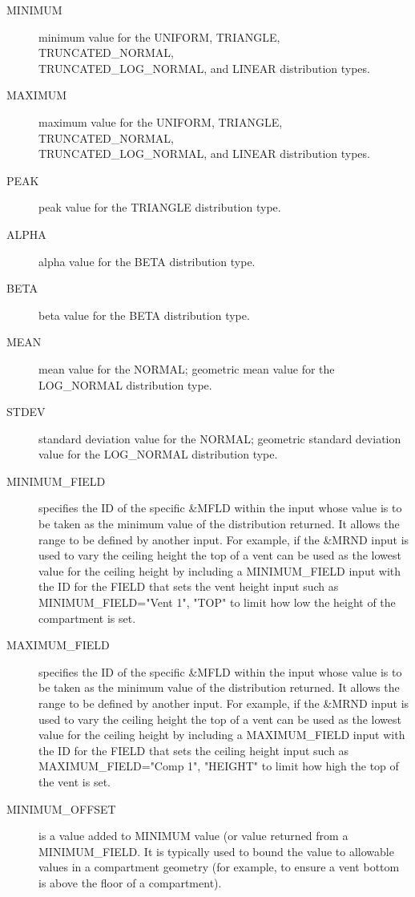 \documentclass[12pt,twoside]{book}
\begin{document}
\begin{description}
  \item[MINIMUM] minimum value for the {\ct UNIFORM}, {\ct TRIANGLE}, {\ct TRUNCATED\_NORMAL}, \\
      {\ct TRUNCATED\_LOG\_NORMAL}, and {\ct LINEAR} distribution types.
  \item[MAXIMUM] maximum value for the {\ct UNIFORM}, {\ct TRIANGLE}, {\ct TRUNCATED\_NORMAL}, \\
      {\ct TRUNCATED\_LOG\_NORMAL}, and {\ct LINEAR} distribution types.
  \item[PEAK] peak value for the {\ct TRIANGLE} distribution type.
  \item[ALPHA] alpha value for the {\ct BETA} distribution type.
  \item[BETA] beta value for the {\ct BETA} distribution type.
  \item[MEAN] mean value for the {\ct NORMAL}; geometric mean value for the {\ct LOG\_NORMAL} distribution type.
  \item[STDEV] standard deviation value for the {\ct NORMAL}; geometric standard deviation value for the {\ct LOG\_NORMAL} distribution type.
  \item[MINIMUM\_FIELD] specifies the ID of the specific \&MFLD within the input whose value is to be taken as the minimum value of the distribution returned. It allows the range to be defined by another input. For example, if the {\ct \&MRND} input is used to vary the ceiling height the top of a vent can be used as the lowest value for the ceiling height by including a {\ct MINIMUM\_FIELD} input with the {\ct ID} for the {\ct FIELD} that sets the vent height input such as {\ct MINIMUM\_FIELD="Vent 1", "TOP"} to limit how low the height of the compartment is set.
  \item[MAXIMUM\_FIELD] specifies the  ID of the specific \&MFLD  within the input whose value is to be taken as the minimum value of the distribution returned. It allows the range to be defined by another input. For example, if the {\ct \&MRND} input is used to vary the ceiling height the top of a vent can be used as the lowest value for the ceiling height by including a {\ct MAXIMUM\_FIELD} input with the {\ct ID} for the {\ct FIELD} that sets the ceiling height input such as {\ct MAXIMUM\_FIELD="Comp 1", "HEIGHT"} to limit how high the top of the vent is set.
  \item[MINIMUM\_OFFSET] is a value added to {\ct MINIMUM} value (or value returned from a {\ct MINIMUM\_FIELD}. It is typically used to bound the value to allowable values in a compartment geometry (for example, to ensure a vent bottom is above the floor of a compartment).

\end{description}
\end{document}
